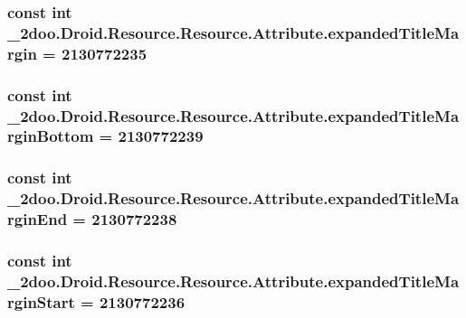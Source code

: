 \hypertarget{class__2doo_1_1_droid_1_1_resource_1_1_attribute_0187310d83d44914ff5741386392bc7d}{
\subsubsection[{expandedTitleMargin}]{\setlength{\rightskip}{0pt plus 5cm}const int \_\-2doo.Droid.Resource.Resource.Attribute.expandedTitleMargin = 2130772235}}
\label{class__2doo_1_1_droid_1_1_resource_1_1_attribute_0187310d83d44914ff5741386392bc7d}


\hypertarget{class__2doo_1_1_droid_1_1_resource_1_1_attribute_c54b0be9edb87c5721c0d90d71eed313}{
\subsubsection[{expandedTitleMarginBottom}]{\setlength{\rightskip}{0pt plus 5cm}const int \_\-2doo.Droid.Resource.Resource.Attribute.expandedTitleMarginBottom = 2130772239}}
\label{class__2doo_1_1_droid_1_1_resource_1_1_attribute_c54b0be9edb87c5721c0d90d71eed313}


\hypertarget{class__2doo_1_1_droid_1_1_resource_1_1_attribute_c61c388a0b32b6ee42d64defd40fc11d}{
\subsubsection[{expandedTitleMarginEnd}]{\setlength{\rightskip}{0pt plus 5cm}const int \_\-2doo.Droid.Resource.Resource.Attribute.expandedTitleMarginEnd = 2130772238}}
\label{class__2doo_1_1_droid_1_1_resource_1_1_attribute_c61c388a0b32b6ee42d64defd40fc11d}


\hypertarget{class__2doo_1_1_droid_1_1_resource_1_1_attribute_101a9c8a6be35d67018dafbca6499b06}{
\subsubsection[{expandedTitleMarginStart}]{\setlength{\rightskip}{0pt plus 5cm}const int \_\-2doo.Droid.Resource.Resource.Attribute.expandedTitleMarginStart = 2130772236}}
\label{class__2doo_1_1_droid_1_1_resource_1_1_attribute_101a9c8a6be35d67018dafbca6499b06}


